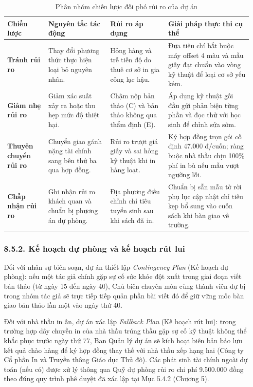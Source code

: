 \begin{table}[htbp]
\centering
\caption{Phân nhóm chiến lược đối phó rủi ro của dự án}
\label{tab:chien_luoc_rui_ro}
\small
{}
\begin{tabularx}{\textwidth}{|p{2.6cm}|p{3.2cm}|Y|Y|}
\hline
\textbf{Chiến lược} & \textbf{Nguyên tắc tác động} & \textbf{Rủi ro áp dụng} & \textbf{Giải pháp thực thi cụ thể} \\
\hline
\textbf{Tránh rủi ro} & Thay đổi phương thức thực hiện loại bỏ nguyên nhân. & Hỏng hàng và trễ tiến độ do thuê cơ sở in gia công lạc hậu. & Đưa tiêu chí bắt buộc máy offset 4 màu và mẫu giấy đạt chuẩn vào vòng kỹ thuật để loại cơ sở yếu kém. \\
\hline
\textbf{Giảm nhẹ rủi ro} & Giảm xác suất xảy ra hoặc thu hẹp mức độ thiệt hại. & Chậm nộp bản thảo (C) và bản thảo không qua thẩm định (E). & Áp dụng kỹ thuật gối đầu gửi phản biện từng phần và đọc thử với học sinh để chỉnh sửa sớm. \\
\hline
\textbf{Thuyên chuyển rủi ro} & Chuyển giao gánh nặng tài chính sang bên thứ ba qua hợp đồng. & Rủi ro trượt giá giấy và sai hỏng kỹ thuật khi in hàng loạt. & Ký hợp đồng trọn gói cố định 47.000 đ/cuốn; ràng buộc nhà thầu chịu 100\% phí in bù nếu mẫu vượt ngưỡng lỗi. \\
\hline
\textbf{Chấp nhận rủi ro} & Ghi nhận rủi ro khách quan và chuẩn bị phương án dự phòng. & Địa phương điều chỉnh chỉ tiêu tuyển sinh sau khi sách đã in. & Chuẩn bị sẵn mẫu tờ rời phụ lục cập nhật chỉ tiêu kẹp bổ sung vào cuốn sách khi bàn giao về trường. \\
\hline
\end{tabularx}
\end{table}

\subsubsection{8.5.2. Kế hoạch dự phòng và kế hoạch rút lui}

Đối với nhân sự biên soạn, dự án thiết lập \textit{Contingency Plan} (Kế hoạch dự phòng): nếu một tác giả chính gặp sự cố sức khỏe đột xuất trong giai đoạn viết bản thảo (từ ngày 15 đến ngày 40), Chủ biên chuyên môn cùng thành viên dự bị trong nhóm tác giả sẽ trực tiếp tiếp quản phần bài viết đó để giữ vững mốc bàn giao bản thảo lần một vào ngày thứ 40.

Đối với nhà thầu in ấn, dự án xác lập \textit{Fallback Plan} (Kế hoạch rút lui): trong trường hợp dây chuyền in của nhà thầu trúng thầu gặp sự cố kỹ thuật không thể khắc phục trước ngày thứ 77, Ban Quản lý dự án sẽ kích hoạt biên bản bảo lưu kết quả chào hàng để ký hợp đồng thay thế với nhà thầu xếp hạng hai (Công ty Cổ phần In và Truyền thông Giáo dục Thủ đô). Các phát sinh tài chính ngoài dự toán (nếu có) được xử lý thông qua Quỹ dự phòng rủi ro chi phí 9.500.000 đồng theo đúng quy trình phê duyệt đã xác lập tại Mục 5.4.2 (Chương 5).

